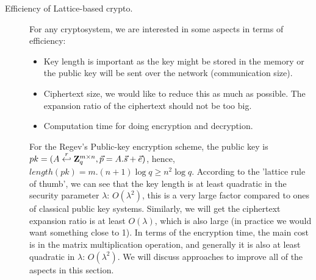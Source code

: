 \begin{description}
\begin{description}
            \end{description}
        \item [Efficiency of Lattice-based crypto.] For any
            cryptosystem, we are interested in some aspects in terms of
            efficiency:
            \begin{itemize}
                \item Key length is important as the key might be
                    stored in the memory or the public key will be sent
                    over the network (communication size).
                \item Ciphertext size, we would like to reduce this as
                    much as possible. The expansion ratio of the
                    ciphertext should not be too big.
                \item Computation time for doing encryption and
                    decryption.
            \end{itemize}
            For the Regev's Public-key encryption scheme, the public key
            is $pk=(A \stackrel{r}{\hookleftarrow} \mathbf{Z}_q^{m \times n},
            \vec{p} = A.\vec{s} + \vec{e})$, hence, $length(pk) =
            m.(n+1)\log q \geq n^2\log q$. According to the 'lattice
            rule of thumb', we can see that the key length is at least
            quadratic in the security parameter $\lambda$:
            $O(\lambda^2)$, this is a very large factor compared to ones
            of
            classical public key systems.
            Similarly, we will get the ciphertext
            expansion ratio is at least $O(\lambda)$, which is also
            large (in practice we would want something close to 1). In
            terms of the encryption time, the main cost is in the matrix
            multiplication operation, and generally it is also at least
            quadratic in $\lambda$: $O(\lambda^2)$. We will discuss
            approaches to improve all of the aspects in this section.


\end{description}
